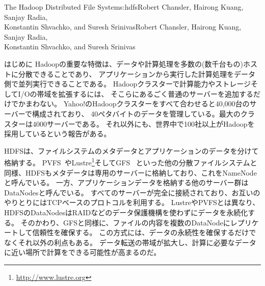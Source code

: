 \begin{aosachaptertoc}{The Hadoop Distributed File System}{s:hdfs}{Robert Chansler, Hairong Kuang, Sanjay Radia, \\ Konstantin Shvachko, and Suresh Srinivas}{Robert Chansler, Hairong Kuang, Sanjay Radia, \\ \hspace*{0.9cm} Konstantin Shvachko, and Suresh Srinivas}
\begin{aosasect1}{はじめに}
Hadoopの重要な特徴は、データや計算処理を多数の(数千台もの)ホストに分散できることであり、
アプリケーションから実行した計算処理をデータ側で並列実行できることである。
Hadoopクラスターで計算能力やストレージそしてI/Oの帯域を拡張するには、
そこらにあるごく普通のサーバーを追加するだけでかまわない。
Yahoo!のHadoopクラスターをすべて合わせると40,000台のサーバーで構成されており、
40ペタバイトのデータを管理している。最大のクラスターは4000サーバーである。
それ以外にも、世界中で100社以上がHadoopを採用しているという報告がある。

HDFSは、ファイルシステムのメタデータとアプリケーションのデータを分けて格納する。
PVFS~\cite{bib:carns:pvfs}やLustre\footnote{\url{http://www.lustre.org}}そしてGFS~\cite{bib:ghemawat:gfs,bib:mckusick:gfs}
といった他の分散ファイルシステムと同様、HDFSもメタデータは専用のサーバーに格納しており、これをNameNodeと呼んでいる。
一方、アプリケーションデータを格納する他のサーバー群はDataNodesと呼んでいる。
すべてのサーバーが完全に接続されており、お互いのやりとりにはTCPベースのプロトコルを利用する。
LustreやPVFSとは異なり、HDFSのDataNodesはRAIDなどのデータ保護機構を使わずにデータを永続化する。
そのかわり、GFSと同様に、ファイルの内容を複数のDataNodeにレプリケートして信頼性を確保する。
この方式には、データの永続性を確保するだけでなくそれ以外の利点もある。
データ転送の帯域が拡大し、計算に必要なデータに近い場所で計算をできる可能性が高まるのだ。


\end{aosasect1}
\end{aosachaptertoc}
